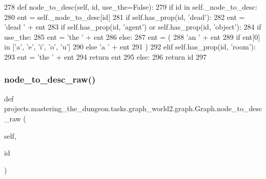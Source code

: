 \begin{DoxyCode}
278     \textcolor{keyword}{def }node\_to\_desc(self, id, use\_the=False):
279         \textcolor{keywordflow}{if} id \textcolor{keywordflow}{in} self.\_node\_to\_desc:
280             ent = self.\_node\_to\_desc[id]
281             \textcolor{keywordflow}{if} self.has\_prop(id, \textcolor{stringliteral}{'dead'}):
282                 ent = \textcolor{stringliteral}{'dead '} + ent
283             \textcolor{keywordflow}{if} self.has\_prop(id, \textcolor{stringliteral}{'agent'}) \textcolor{keywordflow}{or} self.has\_prop(id, \textcolor{stringliteral}{'object'}):
284                 \textcolor{keywordflow}{if} use\_the:
285                     ent = \textcolor{stringliteral}{'the '} + ent
286                 \textcolor{keywordflow}{else}:
287                     ent = (
288                         \textcolor{stringliteral}{'an '} + ent
289                         \textcolor{keywordflow}{if} ent[0] \textcolor{keywordflow}{in} [\textcolor{stringliteral}{'a'}, \textcolor{stringliteral}{'e'}, \textcolor{stringliteral}{'i'}, \textcolor{stringliteral}{'o'}, \textcolor{stringliteral}{'u']}
290 \textcolor{stringliteral}{                        }\textcolor{keywordflow}{else} \textcolor{stringliteral}{'a '} + ent
291                     )
292             \textcolor{keywordflow}{elif} self.has\_prop(id, \textcolor{stringliteral}{'room'}):
293                 ent = \textcolor{stringliteral}{'the '} + ent
294             \textcolor{keywordflow}{return} ent
295         \textcolor{keywordflow}{else}:
296             \textcolor{keywordflow}{return} id
297 
\end{DoxyCode}
\mbox{\label{classprojects_1_1mastering__the__dungeon_1_1tasks_1_1graph__world2_1_1graph_1_1Graph_a79b5f4581006441d287386e8548a92fe}} 
\subsubsection{\texorpdfstring{node\+\_\+to\+\_\+desc\+\_\+raw()}{node\_to\_desc\_raw()}}
{\footnotesize\ttfamily def projects.\+mastering\+\_\+the\+\_\+dungeon.\+tasks.\+graph\+\_\+world2.\+graph.\+Graph.\+node\+\_\+to\+\_\+desc\+\_\+raw (\begin{DoxyParamCaption}\item[{}]{self,  }\item[{}]{id }\end{DoxyParamCaption})}



